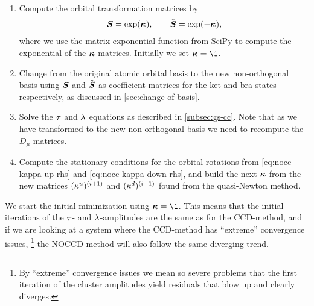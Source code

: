             \begin{enumerate}
                \item Compute the orbital transformation matrices by
                    \begin{gather}
                        \vfg{S} = \exponential(\noccmat),
                        \qquad
                        \tilde{\vfg{S}} = \exponential(-\noccmat),
                    \end{gather}
                    where we use the matrix exponential function
                     from SciPy \cite{scipy} to compute
                    the exponential of the $\boldsymbol{\kappa}$-matrices.
                    Initially we set $\noccmat = \1$.
                \item Change from the original atomic orbital basis to the new
                    non-orthogonal basis using $\boldsymbol{S}$ and $\tilde{\boldsymbol{S}}$
                    as coefficient matrices for the ket and bra states
                    respectively, as discussed in \autoref{sec:change-of-basis}.
                \item Solve the $\tau$ and $\lambda$ equations as
                    described in \autoref{subsec:gs-cc}.
                    Note that as we have transformed to the new non-orthogonal
                    basis we need to recompute the $D_{\mu}$-matrices.
                \item Compute the stationary conditions for the orbital
                    rotations from \autoref{eq:nocc-kappa-up-rhs} and
                    \autoref{eq:nocc-kappa-down-rhs}, and build the next
                    $\boldsymbol{\kappa}$ from the new matrices $(\kappa^{u})^{(i + 1)}$
                    and $(\kappa^{d})^{(i + 1)}$ found from the quasi-Newton
                    method.
            \end{enumerate}
            We start the initial minimization using $\noccmat = \1$.
            This means that the initial iterations of the $\tau$- and
            $\lambda$-amplitudes are the same as for the CCD-method, and if
            we are looking at a system where the CCD-method has ``extreme''
            convergence issues, \footnote{%
                By ``extreme'' convergence issues we mean so severe problems
                that the first iteration of the cluster amplitudes yield
                residuals that blow up and clearly diverges.
            } the NOCCD-method will also follow the same diverging trend.

